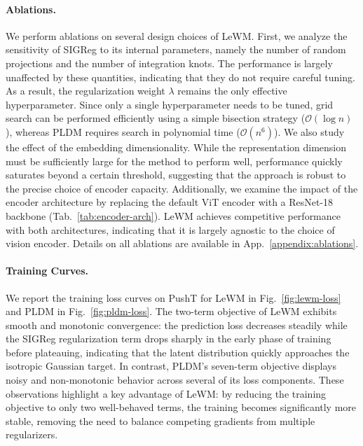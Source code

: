 \paragraph{Ablations.} We perform ablations on several design choices of LeWM. First, we analyze the sensitivity of SIGReg to its internal parameters, namely the number of random projections and the number of integration knots. The performance is largely unaffected by these quantities, indicating that they do not require careful tuning. As a result, the regularization weight $\lambda$ remains the only effective hyperparameter. Since only a single hyperparameter needs to be tuned, grid search can be performed efficiently using a simple bisection strategy ($\mathcal{O}(\log n)$), whereas PLDM requires search in polynomial time ($\mathcal{O}(n^6)$). We also study the effect of the embedding dimensionality. While the representation dimension must be sufficiently large for the method to perform well, performance quickly saturates beyond a certain threshold, suggesting that the approach is robust to the precise choice of encoder capacity. Additionally, we examine the impact of the encoder architecture by replacing the default ViT encoder with a ResNet-18 backbone (Tab.~\ref{tab:encoder-arch}). LeWM achieves competitive performance with both architectures, indicating that it is largely agnostic to the choice of vision encoder. Details on all ablations are available in App.~\ref{appendix:ablations}.


\paragraph{Training Curves.}We report the training loss curves on PushT for LeWM in Fig.~\ref{fig:lewm-loss} and PLDM in Fig.~\ref{fig:pldm-loss}. The two-term objective of LeWM exhibits smooth and monotonic convergence: the prediction loss decreases steadily while the SIGReg regularization term drops sharply in the early phase of training before plateauing, indicating that the latent distribution quickly approaches the isotropic Gaussian target. In contrast, PLDM's seven-term objective displays noisy and non-monotonic behavior across several of its loss components. These observations highlight a key advantage of LeWM: by reducing the training objective to only two well-behaved terms, the training becomes significantly more stable, removing the need to balance competing gradients from multiple regularizers.

